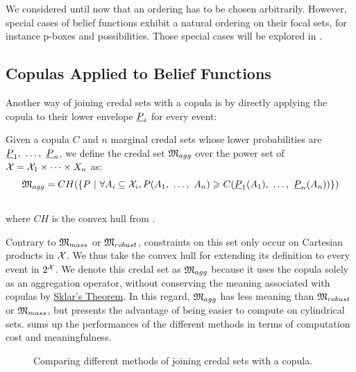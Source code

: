 We considered until now that an ordering has to be chosen arbitrarily. However, special cases of belief functions exhibit a natural ordering on their focal sets, for instance p-boxes and possibilities. Those special cases will be explored in .

\subsection{Copulas Applied to Belief Functions}\label{sec:aggregation_method}
Another way of joining credal sets with a copula is by directly applying the copula to their lower envelope $\underline{P}_i$ for every event:
\begin{definition}\label{def:aggregation_credal_set}
    Given a copula $C$ and $n$ marginal credal sets whose lower probabilities are $\underline{P}_1 , ~\ldots, ~ \underline{P}_n$, we define the credal set $\mathfrak{M}_{agg}$ over the power set of $\mathcal{X}=\mathcal{X}_1\times\dots\times X_n$ as:
    \begin{eqnarray}
        \mathfrak{M}_{agg} = CH(\{P ~|~\forall A_i\subseteq\mathcal{X}_i, P(A_1 , ~\ldots, ~  A_n)\geqslant C(\underline{P}_1(A_1) , ~\ldots, ~ \underline{P}_n(A_n))\})\nonumber\\
        \,\label{eq:copula_on_lower_proba}
    \end{eqnarray}
    where $CH$ is the convex hull from .
\end{definition}

Contrary to $\mathfrak{M}_{mass}$ or $\mathfrak{M}_{robust}$, constraints on this set only occur on Cartesian products in $\mathcal{X}$. We thus take the convex hull for extending its definition to every event in $2^{\mathcal{X}}$. We denote this credal set as $\mathfrak{M}_{agg}$ because it uses the copula solely as an aggregation operator, without conserving the meaning associated with copulas by \hyperref[theorem:sklar]{Sklar's Theorem}. In this regard, $\mathfrak{M}_{agg}$ has less meaning than $\mathfrak{M}_{robust}$ or $\mathfrak{M}_{mass}$, but presents the advantage of being easier to compute on cylindrical sets.  sums up the performances of the different methods in terms of computation cost and meaningfulness.

\begin{figure}[!hb]
    \centering
    \caption{Comparing different methods of joining credal sets with a copula.}
    \label{fig:meaning_computation}
\end{figure}

